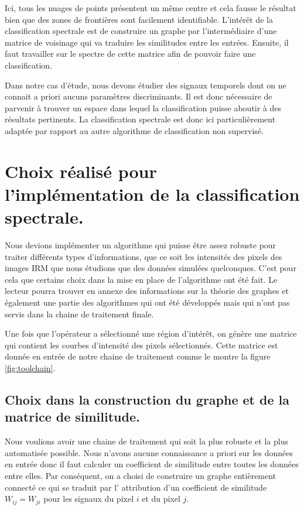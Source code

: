 Ici, tous les nuages de points présentent un même centre et cela fausse le résultat bien que des zones de frontières sont facilement identifiable. L'intérêt de la classification spectrale est de construire un graphe par l'intermédiaire d'une matrice de voisinage qui va traduire les similitudes entre les entrées. Ensuite, il faut travailler sur le spectre de cette matrice afin de pouvoir faire une classification. 

\medskip

Dans notre cas d'étude, nous devons étudier des signaux temporels dont on ne connait a priori aucuns paramètres discriminants. Il est donc nécessaire de parvenir à trouver un espace dans lequel la classification puisse aboutir à des résultats pertinents. La classification spectrale est donc ici particulièrement adaptée par rapport au autre algorithme de classification non supervisé.

\chapter{Choix réalisé pour l'implémentation de la classification spectrale.}

Nous devions implémenter un algorithme qui puisse être assez robuste pour traiter différents types d'informations, que ce soit les intensités des pixels des images IRM que nous étudions que des données simulées quelconques. C'est pour cela que certains choix dans la mise en place de l'algorithme ont été fait. Le lecteur pourra trouver en annexe des informations sur la théorie des graphes et également une partie des algorithmes qui ont été développés mais qui n'ont pas servis dans la chaine de traitement finale.

Une fois que l'opérateur a sélectionné une région d'intérêt, on génère une matrice qui contient les courbes d'intensité des pixels sélectionnés. Cette matrice est donnée en entrée de notre chaine de traitement comme le montre la figure \ref{fig:toolchain}.

\section{Choix dans la construction du graphe et de la matrice de similitude.}

Nous voulions avoir une chaine de traitement qui soit la plus robuste et la plus automatisée possible. Nous n'avons aucune connaissance a priori sur les données en entrée donc il faut calculer un coefficient de similitude entre toutes les données entre elles. Par conséquent, on a choisi de construire un graphe entièrement connecté ce qui se traduit par l' attribution d'un coefficient de similitude $W_{ij} = W_{ji}$ pour les signaux du pixel $i$ et du pixel $j$.  

